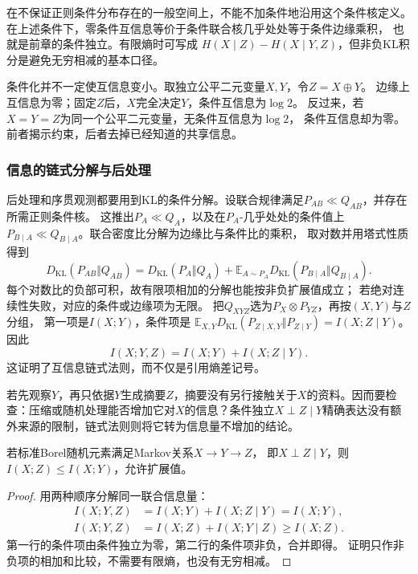 在不保证正则条件分布存在的一般空间上，不能不加条件地沿用这个条件核定义。
在上述条件下，零条件互信息等价于条件联合核几乎处处等于条件边缘乘积，
也就是前章的条件独立。有限熵时可写成
\(H(X\mid Z)-H(X\mid Y,Z)\)，但非负KL积分是避免无穷相减的基本口径。

条件化并不一定使互信息变小。取独立公平二元变量\(X,Y\)，令\(Z=X\oplus Y\)。
边缘上互信息为零；固定\(Z\)后，\(X\)完全决定\(Y\)，条件互信息为\(\log2\)。
反过来，若\(X=Y=Z\)为同一个公平二元变量，无条件互信息为\(\log2\)，
条件互信息却为零。前者揭示约束，后者去掉已经知道的共享信息。

\subsubsection{信息的链式分解与后处理}
后处理和序贯观测都要用到KL的条件分解。设联合规律满足\(P_{AB}\ll Q_{AB}\)，并存在所需正则条件核。
这推出\(P_A\ll Q_A\)，以及在\(P_A\)-几乎处处的条件值上
\(P_{B\mid A}\ll Q_{B\mid A}\)。联合密度比分解为边缘比与条件比的乘积，
取对数并用塔式性质得到
\begin{equation}
  D_{\mathrm{KL}}(P_{AB}\Vert Q_{AB})
  =D_{\mathrm{KL}}(P_A\Vert Q_A)
   +\mathbb E_{A\sim P_A}
       D_{\mathrm{KL}}(P_{B\mid A}\Vert Q_{B\mid A}).
  \label{eq:information-kl-conditional-chain}
\end{equation}
每个对数比的负部可积，故有限项相加的分解也能按非负扩展值成立；
若绝对连续性失败，对应的条件或边缘项为无限。
把\(Q_{XYZ}\)选为\(P_X\otimes P_{YZ}\)，再按\((X,Y)\)与\(Z\)分组，
第一项是\(I(X;Y)\)，条件项是
\(\mathbb E_{X,Y}D_{\mathrm{KL}}(P_{Z\mid X,Y}\Vert P_{Z\mid Y})
=I(X;Z\mid Y)\)。因此
\[
  I(X;Y,Z)=I(X;Y)+I(X;Z\mid Y).
\]
这证明了互信息链式法则，而不仅是引用熵差记号。

若先观察\(Y\)，再只依据\(Y\)生成摘要\(Z\)，摘要没有另行接触关于\(X\)的资料。因而要检查：压缩或随机处理能否增加它对\(X\)的信息？条件独立\(X\perp Z\mid Y\)精确表达没有额外来源的限制，链式法则则将它转为信息量不增加的结论。
\begin{theorem}[数据处理不等式]
\label{thm:information-data-processing}
若标准Borel随机元素满足Markov关系\(X\to Y\to Z\)，
即\(X\perp Z\mid Y\)，则\(I(X;Z)\leq I(X;Y)\)，允许扩展值。
\end{theorem}
\begin{proof}
用两种顺序分解同一联合信息量：
\[
\begin{aligned}
  I(X;Y,Z)&=I(X;Y)+I(X;Z\mid Y)=I(X;Y),\\
  I(X;Y,Z)&=I(X;Z)+I(X;Y\mid Z)\geq I(X;Z).
\end{aligned}
\]
第一行的条件项由条件独立为零，第二行的条件项非负，合并即得。
证明只作非负项的相加和比较，不需要有限熵，也没有无穷相减。
\end{proof}

